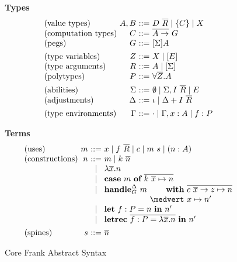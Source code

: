 \documentclass[12pt]{article}
\makeatletter
\newcommand{\fighead}{\textbf}
\newcommand{\many}{\overline}
\newcommand\ba{\begin{array}}
\newcommand\ea{\end{array}}
\newenvironment{syntax}{\[\ba{@{}l@{~}r@{~}c@{~}l@{}}}{\ea\]\ignorespacesafterend}
\newcommand{\sig}{I}
\newcommand{\sigs}{\Sigma}
\newcommand{\effbox}[1]{[#1]}
\newcommand{\key}[1]{\textbf{#1}} %
\newcommand{\handleSymbol}{\rightarrow}
\newcommand{\handle}[2]{{#1} \handleSymbol {#2}}
\newcommand{\thunk}[1]{\{{#1}\}}
\newcommand\slab[1]{(\textrm{#1})}
\newcommand{\adj}{\Delta}
\newcommand{\ev}{E}
\newcommand{\nowt}{\emptyset}
\newcommand{\id}{\iota}
\makeatother
\begin{document}
\begin{figure}
\fighead{Types}
\begin{syntax}
\slab{value types}       &A, B     &::=& D~\many{R} \mid \thunk{C} \mid X \\
\slab{computation types} &C        &::=& \many{A \to}~G \\
\slab{pegs}              &G             &::=& \effbox{\sigs}A \\
[1ex]
\slab{type variables}    &Z        &::=& X \mid \effbox{\ev} \\
\slab{type arguments}    &R        &::=& A \mid \effbox{\sigs} \\
\slab{polytypes}         &P        &::=& \forall \many{Z}.A \\
[1ex]
\slab{abilities}    &\sigs  &::=&
  \nowt \mid \sigs, \sig~\many{R} \mid \ev \\
\slab{adjustments}  &\adj  &::=&
  \id \mid \adj + \sig~\many{R} \\
[1ex]
\slab{type environments}
                    &\Gamma        &::=& \cdot \mid \Gamma, x:A \mid f:P \\
\end{syntax}

\fighead{Terms}
\begin{syntax}
\slab{uses}         &m       &::=& x \mid f~\many{R} \mid c \mid m~s \mid (n : A) \\
\slab{constructions}&n       &::=& m \mid k~\many{n} \\
   &&\mid& \lambda \many{x}.n \\
   &&\mid& \key{case}~m~\key{of}~
             \many{k~\many{x} \mapsto n} \\
   &&\mid& \key{handle}^\adj_G~m~
             \ba[t]{@{}r@{}l@{}}
             \key{with}~& \many{\handle{c~\many{x}}{z} \mapsto n} \\
             \medvert~  &  x \mapsto n' \\
             \ea \\
   &&\mid&  \key{let}~f : P = n~\key{in}~n' \\
   &&\mid&  \key{letrec}~\many{f : P = \lambda \many{x}.n}~\key{in}~n' \\
[1ex]
\slab{spines}&s           &::=& \many{n} \\
\end{syntax}
\caption{Core Frank Abstract Syntax}
\label{fig:core-syntax}
\end{figure}
\end{document}
